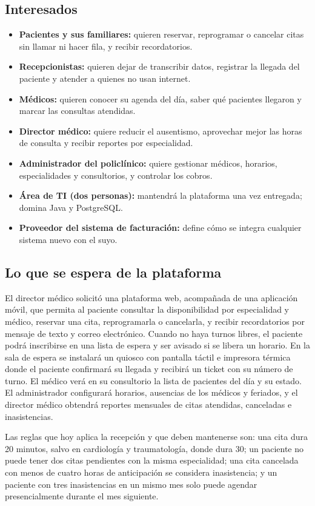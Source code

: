 \documentclass[11pt]{article}
\newcommand{\subseccion}[1]{\subsection{\textcolor{midblue}{#1}}}
\begin{document}
\subseccion{Interesados}
\begin{itemize}
	\item \textbf{Pacientes y sus familiares:} quieren reservar, reprogramar o cancelar citas sin llamar ni hacer fila, y recibir recordatorios.
	\item \textbf{Recepcionistas:} quieren dejar de transcribir datos, registrar la llegada del paciente y atender a quienes no usan internet.
	\item \textbf{Médicos:} quieren conocer su agenda del día, saber qué pacientes llegaron y marcar las consultas atendidas.
	\item \textbf{Director médico:} quiere reducir el ausentismo, aprovechar mejor las horas de consulta y recibir reportes por especialidad.
	\item \textbf{Administrador del policlínico:} quiere gestionar médicos, horarios, especialidades y consultorios, y controlar los cobros.
	\item \textbf{Área de TI (dos personas):} mantendrá la plataforma una vez entregada; domina Java y PostgreSQL.
	\item \textbf{Proveedor del sistema de facturación:} define cómo se integra cualquier sistema nuevo con el suyo.
\end{itemize}

\subseccion{Lo que se espera de la plataforma}
El director médico solicitó una plataforma web, acompañada de una aplicación móvil, que permita al paciente consultar la disponibilidad por especialidad y médico, reservar una cita, reprogramarla o cancelarla, y recibir recordatorios por mensaje de texto y correo electrónico. Cuando no haya turnos libres, el paciente podrá inscribirse en una lista de espera y ser avisado si se libera un horario. En la sala de espera se instalará un quiosco con pantalla táctil e impresora térmica donde el paciente confirmará su llegada y recibirá un ticket con su número de turno. El médico verá en su consultorio la lista de pacientes del día y su estado. El administrador configurará horarios, ausencias de los médicos y feriados, y el director médico obtendrá reportes mensuales de citas atendidas, canceladas e inasistencias.

Las reglas que hoy aplica la recepción y que deben mantenerse son: una cita dura 20 minutos, salvo en cardiología y traumatología, donde dura 30; un paciente no puede tener dos citas pendientes con la misma especialidad; una cita cancelada con menos de cuatro horas de anticipación se considera inasistencia; y un paciente con tres inasistencias en un mismo mes solo puede agendar presencialmente durante el mes siguiente.
\end{document}
